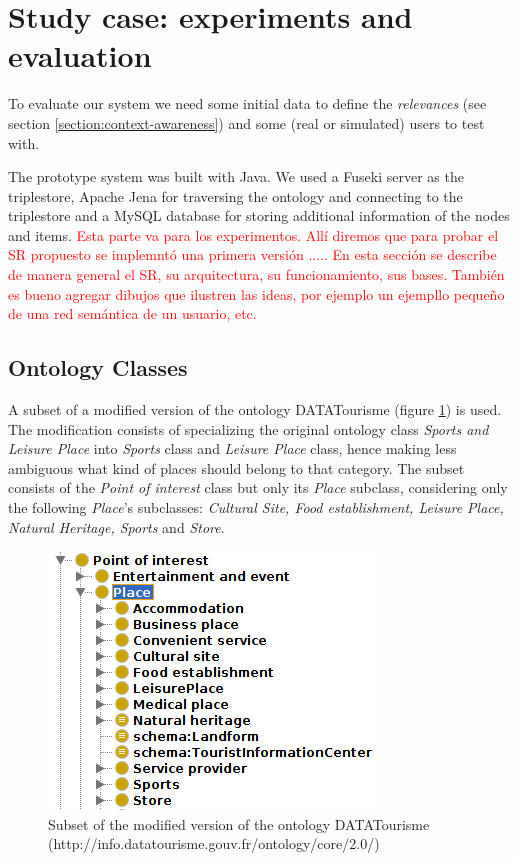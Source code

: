 \section{Study case: experiments and evaluation}
To evaluate our system we need some initial data to define the \textit{relevances} (see section \ref{section:context-awareness}) and some (real or simulated) users to test with.

The prototype system was built with Java. We used a Fuseki server as the triplestore, Apache Jena for traversing the ontology and connecting to the triplestore and a MySQL database for storing additional information of the nodes and items. \textcolor{red}{Esta parte va para los experimentos. Allí diremos que para probar el SR propuesto se implemntó una primera versión ..... En esta sección se describe de manera general el SR, su arquitectura, su funcionamiento, sus bases. También es bueno agregar dibujos que ilustren las ideas, por ejemplo un ejempllo pequeño de una red semántica de un usuario, etc.}

\subsection{Ontology Classes}
A subset of a modified version of the ontology DATATourisme (figure \ref{fig:ontology}) is used. The modification consists of specializing the original ontology class \textit{Sports and Leisure Place} into \textit{Sports} class and \textit{Leisure Place} class, hence making less ambiguous what kind of places should belong to that category. The subset consists of the \textit{Point of interest} class but only its \textit{Place} subclass, considering only the following \textit{Place}'s subclasses: \textit{Cultural Site, Food establishment, Leisure Place, Natural Heritage, Sports} and \textit{Store}. 


\begin{figure}[h]
\centering
\includegraphics[scale=0.5]{ontology.png}
\caption{Subset of the modified version of the ontology DATATourisme (http://info.datatourisme.gouv.fr/ontology/core/2.0/)}
\label{fig:ontology}
\end{figure}

